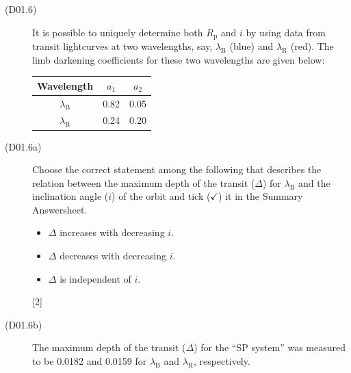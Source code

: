 \begin{description}
\item[(D01.6)] It is possible to uniquely determine both $R_{\mathrm{p}}$ and
  $i$ by using data from transit lightcurves at two wavelengths, say,
  $\lambda_{\mathrm{B}}$ (blue) and $\lambda_{\mathrm{R}}$ (red). The limb
  darkening coefficients for these two wavelengths are given below:

  \begin{center}
  \begin{tabular}{ccc}
  \toprule
  Wavelength & $a_1$ & $a_2$\\
  \midrule
  $\lambda_{\mathrm{B}}$ & 0.82 & 0.05\\
  $\lambda_{\mathrm{R}}$ & 0.24 & 0.20\\
  \bottomrule
  \end{tabular}
  \end{center}
\item[(D01.6a)] Choose the correct statement among the following that
  describes the relation between the maximum depth of the transit ($\Delta$)
  for $\lambda_{\mathrm{B}}$ and the inclination angle ($i$) of the orbit and
  tick ($\checkmark$) it in the Summary Answersheet.

  \begin{itemize}
  \item[(A)] $\Delta$ increases with decreasing $i$.
  \item[(B)] $\Delta$ decreases with decreasing $i$.
  \item[(C)] $\Delta$ is independent of $i$.
  \end{itemize}
  \hfill[2]
\item[(D01.6b)] The maximum depth of the transit ($\Delta$) for the ``SP
  system'' was measured to be 0.0182 and 0.0159 for $\lambda_{\mathrm{B}}$ and
  $\lambda_{\mathrm{R}}$, respectively.


\end{description}
